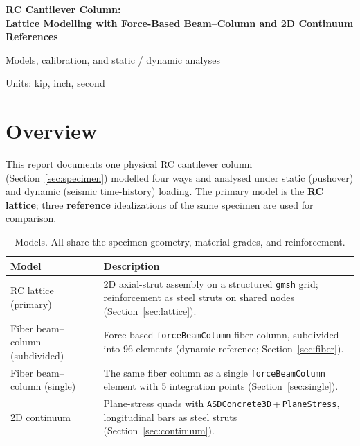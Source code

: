 \documentclass[11pt]{article}
\newcommand{\code}[1]{\texttt{#1}}
\begin{document}
\pagestyle{plain}

\thispagestyle{empty}
\vspace*{0.30\textheight}
\begin{center}
{\LARGE\bfseries RC Cantilever Column:\\[4pt] Lattice Modelling with Force-Based
Beam--Column and 2D Continuum References}\par
\vspace{12pt}
{\large Models, calibration, and static / dynamic analyses}\par
\vspace{6pt}
{\normalsize Units: kip, inch, second}
\end{center}
\clearpage

\tableofcontents
\clearpage

\section{Overview}

This report documents one physical RC cantilever column (Section~\ref{sec:specimen})
modelled four ways and analysed under static (pushover) and dynamic (seismic
time-history) loading. The primary model is the \textbf{RC lattice}; three
\textbf{reference} idealizations of the same specimen are used for comparison.

\begin{table}[H]
\centering
\caption{Models. All share the specimen geometry, material grades, and reinforcement.}
\label{tab:models}
\begin{tabular}{>{\raggedright\arraybackslash}p{3.6cm} >{\raggedright\arraybackslash}p{11.6cm}}
\toprule
Model & Description \\
\midrule
RC lattice (primary)          & 2D axial-strut assembly on a structured \code{gmsh} grid; reinforcement as steel struts on shared nodes (Section~\ref{sec:lattice}). \\
Fiber beam--column (subdivided) & Force-based \code{forceBeamColumn} fiber column, subdivided into 96 elements (dynamic reference; Section~\ref{sec:fiber}). \\
Fiber beam--column (single)   & The same fiber column as a single \code{forceBeamColumn} element with 5 integration points (Section~\ref{sec:single}). \\
2D continuum                  & Plane-stress quads with \code{ASDConcrete3D}\,+\,\code{PlaneStress}, longitudinal bars as steel struts (Section~\ref{sec:continuum}). \\
\bottomrule
\end{tabular}
\end{table}
\end{document}
